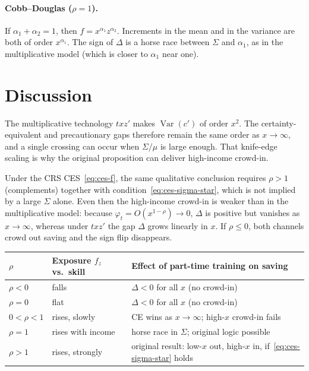 \documentclass[12pt]{article}
\begin{document}
\paragraph{Cobb--Douglas ($\rho=1$).}
If $\alpha_1+\alpha_2=1$, then $f=x^{\alpha_1}z^{\alpha_2}$. Increments in the mean and in the variance are both of order $x^{\alpha_1}$. The sign of $\Delta$ is a horse race between $\Sigma$ and $\alpha_1$, as in the multiplicative model (which is closer to $\alpha_1$ near one).

\section{Discussion}

The multiplicative technology $txz'$ makes $\operatorname{Var}(c')$ of order $x^2$. The certainty-equivalent and precautionary gaps therefore remain the same order as $x\to\infty$, and a single crossing can occur when $\Sigma/\mu$ is large enough. That knife-edge scaling is why the original proposition can deliver high-income crowd-in.

Under the CRS CES~\eqref{eq:ces-f}, the same qualitative conclusion requires $\rho>1$ (complements) together with condition~\eqref{eq:ces-sigma-star}, which is not implied by a large $\Sigma$ alone. Even then the high-income crowd-in is weaker than in the multiplicative model: because $\varphi_t=O(x^{1-\rho})\to 0$, $\Delta$ is positive but vanishes as $x\to\infty$, whereas under $txz'$ the gap $\Delta$ grows linearly in $x$. If $\rho\le 0$, both channels crowd out saving and the sign flip disappears.

\begin{center}
\begin{tabular}{lll}
\toprule
$\rho$ & Exposure $f_z$ vs.\ skill & Effect of part-time training on saving \\
\midrule
$\rho<0$ & falls & $\Delta<0$ for all $x$ (no crowd-in) \\
$\rho=0$ & flat & $\Delta<0$ for all $x$ (no crowd-in) \\
$0<\rho<1$ & rises, slowly & CE wins as $x\to\infty$; high-$x$ crowd-in fails \\
$\rho=1$ & rises with income & horse race in $\Sigma$; original logic possible \\
$\rho>1$ & rises, strongly & original result: low-$x$ out, high-$x$ in, if~\eqref{eq:ces-sigma-star} holds \\
\bottomrule
\end{tabular}
\end{center}
\end{document}
